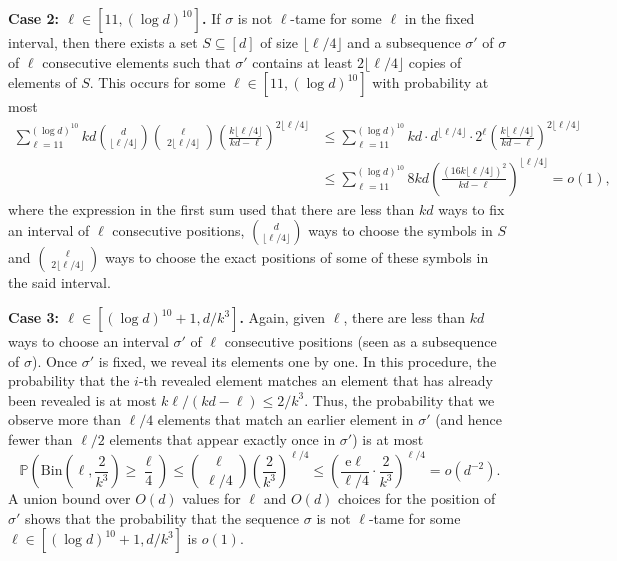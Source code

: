 \documentclass[reqno,final,a4paper]{amsart}
\theoremstyle{definition}
\def\e{\mathrm{e}}
\newcommand{\1}{\mathbbm{1}}
\begin{document}
\vspace{0.5em}
\noindent 
\textbf{Case 2: $\ell\in [11,(\log d)^{10}]$.} If $\sigma$ is not $\ell$-tame for some $\ell$ in the fixed interval, then there exists a set $S\subseteq [d]$ of size $\lfloor \ell/4\rfloor$ and a subsequence $\sigma'$ of $\sigma$ of $\ell$ consecutive elements such that $\sigma'$ contains at least $2\lfloor \ell/4\rfloor$ copies of elements of $S$. 
This occurs for some $\ell\in [11,(\log d)^{10}]$ with probability at most
\begin{align*}
\sum_{\ell=11}^{(\log d)^{10}} kd \binom{d}{\lfloor \ell/4\rfloor} \binom{\ell}{2\lfloor \ell/4\rfloor} \left(\frac{k \lfloor \ell/4\rfloor}{kd-\ell} \right)^{2\lfloor \ell/4\rfloor}
& \leq \sum_{\ell=11}^{(\log d)^{10}} kd \cdot d^{\lfloor \ell/4\rfloor}\cdot 2^\ell \left(\frac{k \lfloor \ell/4\rfloor}{kd-\ell} \right)^{2\lfloor \ell/4\rfloor}
\\&\leq \sum_{\ell=11}^{(\log d)^{10}} 8kd  \left(\frac{(16k \lfloor \ell/4\rfloor)^2}{kd-\ell} \right)^{\lfloor \ell/4\rfloor}=o(1),
\end{align*}
where the expression in the first sum used that there are less than $kd$ ways to fix an interval of $\ell$ consecutive positions, $\binom{d}{\lfloor \ell/4\rfloor}$ ways to choose the symbols in $S$ and $\binom{\ell}{2\lfloor \ell/4\rfloor}$ ways to choose the exact positions of some of these symbols in the said interval.

\vspace{0.5em}
\noindent \textbf{Case 3: $\ell\in [(\log d)^{10}+1,d/k^3]$.} Again, given $\ell$, there are less than $kd$ ways to choose an interval $\sigma'$ of $\ell$ consecutive positions (seen as a subsequence of $\sigma$).
Once $\sigma'$ is fixed, we reveal its elements one by one. 
In this procedure, the probability that the $i$-th revealed element matches an element that has already been revealed is at most $k\ell/(kd-\ell)\leq 2/k^3$.
Thus, the probability that we observe more than $\ell/4$ elements that match an earlier element in $\sigma'$
(and hence fewer than $\ell/2$ elements that appear exactly once in $\sigma'$) is at most
\[
\mathbb P\left(\mathrm{Bin}\left(\ell,\frac{2}{k^3}\right)\geq \frac{\ell}{4}\right)
\leq \binom{\ell}{\ell/4} \left(\frac{2}{k^3}\right)^{\ell/4}
\leq \left(\frac{\e\ell}{\ell/4}\cdot \frac{2}{k^3}  \right)^{\ell/4}=o(d^{-2}).\]
A union bound over $O(d)$ values for $\ell$ and $O(d)$ choices for the position of $\sigma'$ shows that the probability that the sequence $\sigma$ is not $\ell$-tame for some $\ell\in [(\log d)^{10}+1,d/k^3]$ is $o(1)$.
\end{document}
